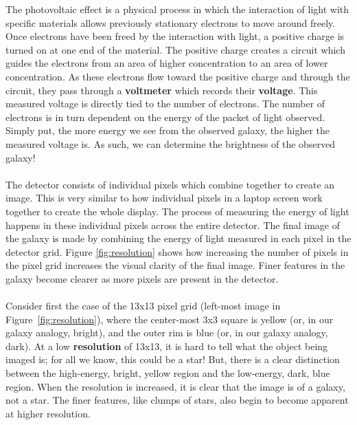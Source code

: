 \documentclass[14pt]{article}
\begin{document}
The photovoltaic effect is a physical process in which the interaction of light with specific materials allows previously stationary electrons to move around freely. Once electrons have been freed by the interaction with light, a positive charge is turned on at one end of the material. The positive charge creates a circuit which guides the electrons from an area of higher concentration to an area of lower concentration. As these electrons flow toward the positive charge and through the circuit, they pass through a \textbf{voltmeter} which records their \textbf{voltage}.
This measured voltage is directly tied to the number of electrons. The number of electrons is in turn dependent on the energy of the packet of light observed. Simply put, the more energy we see from the observed galaxy, the higher the measured voltage is. As such, we can determine the brightness of the observed galaxy! 
\\\\
The detector consists of individual pixels which combine together to create an image. This is very similar to how individual pixels in a laptop screen work together to create the whole display. The process of measuring the energy of light happens in these individual pixels across the entire detector. The final image of the galaxy is made by combining the energy of light measured in each pixel in the detector grid. Figure \ref{fig:resolution} shows how increasing the number of pixels in the pixel grid increases the visual clarity of the final image. Finer features in the galaxy become clearer as more pixels are present in the detector. 
\\\\
Consider first the case of the 13x13 pixel grid (left-most image in Figure~\ref{fig:resolution}), where the center-most 3x3 square is yellow (or, in our galaxy analogy, bright), and the outer rim is blue (or, in our galaxy analogy, dark). At a low \textbf{resolution} of 13x13, it is hard to tell what the object being imaged is; for all we know, this could be a star! But, there is a clear distinction between the high-energy, bright, yellow region and the low-energy, dark, blue region. When the resolution is increased, it is clear that the image is of a galaxy, not a star. The finer features, like clumps of stars, also begin to become apparent at higher resolution.
\end{document}
